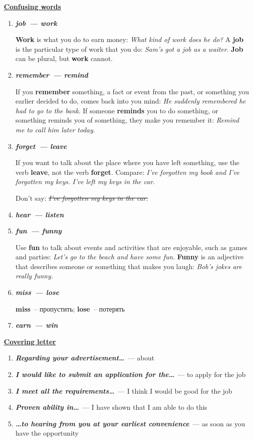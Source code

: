 \documentclass[10pt,a4paper]{article}
\newcommand\ex[1]{\textit{\textbf{{#1}}}}
\begin{document}
\textbf{\underline{Confusing words}}
\begin{enumerate}
  \item \ex{job~--- work}
  
  \textbf{Work} is what you do to earn money: \textit{What kind of work does he do?} A \textbf{job} is the particular type of work that you do: \textit{Sam's got a job as a waiter}. \textbf{Job} can be plural, but \textbf{work} cannot.
  \item \ex{remember~--- remind}
  
  If you \textbf{remember} something, a fact or event from the past, or something you earlier decided to do, comes back into you mind: \textit{He suddenly remembered he had to go to the bank}. If someone \textbf{reminds} you to do something, or something reminds you of something, they make you remember it: \textit{Remind me to call him later today}.
  \item \ex{forget~--- leave}
  
  If you want to talk about the place where you have left something, use the verb \textbf{leave}, not the verb \textbf{forget}. Compare: \textit{I've forgotten my book and I've forgotten my keys.} \textit{I've left my keys in the car}. 
  
  Don't say: \textit{\sout{I've forgotten my keys in the car.}}
  \item \ex{hear~--- listen}
  \item \ex{fun~--- funny}
  
  Use \textbf{fun} to talk about events and activities that are enjoyable, such as games and parties: \textit{Let's go to the beach and have some fun.} \textbf{Funny} is an adjective that describes someone or something that makes you laugh: \textit{Bob's jokes are really funny.}
  \item \ex{miss~--- lose}
  
  \textbf{miss}~-- пропустить; \textbf{lose}~-- потерять
  \item \ex{earn~--- win}  
\end{enumerate}

\par\medskip\textbf{\underline{Covering letter}}
\begin{enumerate}
  \item \ex{Regarding your advertisement\dots}~--- about
  \item \ex{I would like to submit an application for the\dots}~--- to apply for the job
  \item \ex{I meet all the requirements\dots}~--- I think I would be good for the job
  \item \ex{Proven ability in\dots}~--- I have shown that I am able to do this
  \item \ex{\dots to hearing from you at your earliest convenience}~--- as soon as you have the opportunity
\end{enumerate}
\end{document}
